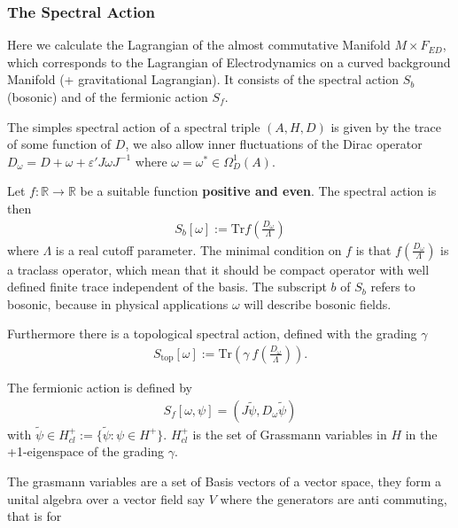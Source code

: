 \subsubsection{The Spectral Action}
Here we calculate the Lagrangian of the almost commutative Manifold $M\times
F_{ED}$, which corresponds to the Lagrangian of Electrodynamics on a curved
background Manifold (+ gravitational Lagrangian). It consists of the spectral
action $S_b$ (bosonic) and of the fermionic action $S_f$.

The simples spectral action of a spectral triple $(A, H, D)$ is given by the
trace of some function of $D$, we also allow inner fluctuations of the Dirac
operator $D_\omega = D + \omega + \varepsilon' J\omega J^{-1}$ where $\omega =
\omega ^* \in \Omega_D^1(A)$.
\begin{definition}
    Let $f:\mathbb{R} \rightarrow \mathbb{R}$ be a suitable function
    \textbf{positive and even}. The spectral action is then
    \begin{align}
        S_b [\omega] := \text{Tr}f(\frac{D_\omega}{\Lambda})
    \end{align}
    where $\Lambda$ is a real cutoff parameter. The minimal condition on $f$
    is that $f(\frac{D_\omega}{\Lambda})$ is  a traclass operator, which mean
    that it should be compact operator with well defined finite trace
    independent of the basis. The subscript $b$ of $S_b$ refers to bosonic,
    because in physical applications $\omega$ will describe bosonic fields.

    Furthermore there is a topological spectral action, defined with the
    grading $\gamma$
    \begin{align}
        S_{\text{top}}[\omega] := \text{Tr}(\gamma\
        f(\frac{D_\omega}{\Lambda})).
    \end{align}
\end{definition}
\begin{definition}
    The fermionic action is defined by
    \begin{align}
        S_f[\omega, \psi] = (J\tilde{\psi}, D_\omega \tilde{\psi})
    \end{align}
    with $\tilde{\psi} \in H_{cl}^+ := \{\tilde{\psi}: \psi \in H^+\}$.
    $H_{cl}^+$ is the set of Grassmann variables in $H$ in the +1-eigenspace
    of the grading $\gamma$.
\end{definition}
The grasmann variables are a set of Basis vectors of a vector space, they
form a unital algebra over a vector field say $V$ where the generators are anti commuting, that is for
